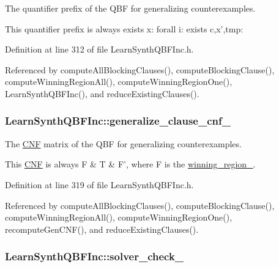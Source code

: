 The quantifier prefix of the Q\-B\-F for generalizing counterexamples. 

This quantifier prefix is always exists x\-: forall i\-: exists c,x',tmp\-: 

Definition at line 312 of file Learn\-Synth\-Q\-B\-F\-Inc.\-h.



Referenced by compute\-All\-Blocking\-Clauses(), compute\-Blocking\-Clause(), compute\-Winning\-Region\-All(), compute\-Winning\-Region\-One(), Learn\-Synth\-Q\-B\-F\-Inc(), and reduce\-Existing\-Clauses().

\hypertarget{classLearnSynthQBFInc_ad3d20b7d5e6b561c7cf46324962247ba}{
\subsubsection[{generalize\-\_\-clause\-\_\-cnf\-\_\-}]{ Learn\-Synth\-Q\-B\-F\-Inc\-::generalize\-\_\-clause\-\_\-cnf\-\_\-\hspace{0.3cm}{\ttfamily [protected]}}}\label{classLearnSynthQBFInc_ad3d20b7d5e6b561c7cf46324962247ba}


The \hyperlink{classCNF}{C\-N\-F} matrix of the Q\-B\-F for generalizing counterexamples. 

This \hyperlink{classCNF}{C\-N\-F} is always F \& T \& F', where F is the \hyperlink{classLearnSynthQBFInc_abc3503bdb6be7053a7c3d3d7e57858d6}{winning\-\_\-region\-\_\-}. 

Definition at line 319 of file Learn\-Synth\-Q\-B\-F\-Inc.\-h.



Referenced by compute\-All\-Blocking\-Clauses(), compute\-Blocking\-Clause(), compute\-Winning\-Region\-All(), compute\-Winning\-Region\-One(), recompute\-Gen\-C\-N\-F(), and reduce\-Existing\-Clauses().

\hypertarget{classLearnSynthQBFInc_aff50a974e8faf0e9e9d7431b46e0d8c5}{
\subsubsection[{solver\-\_\-check\-\_\-}]{ Learn\-Synth\-Q\-B\-F\-Inc\-::solver\-\_\-check\-\_\-\hspace{0.3cm}{\ttfamily [protected]}}}\label{classLearnSynthQBFInc_aff50a974e8faf0e9e9d7431b46e0d8c5}


